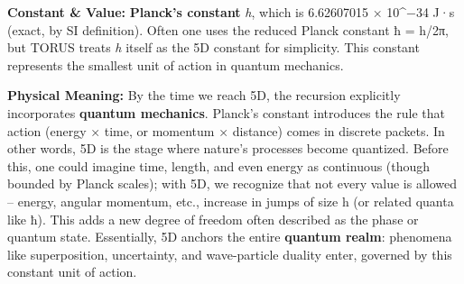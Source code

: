 \documentclass[
]{article}
\begin{document}
\textbf{Constant \& Value:} \textbf{Planck's constant} \emph{h}, which
is 6.62607015 × 10\^{}−34 J·s (exact, by SI definition)\hspace{0pt}.
Often one uses the reduced Planck constant ħ = h/2π, but TORUS treats
\emph{h} itself as the 5D constant for simplicity. This constant
represents the smallest unit of action in quantum mechanics.

\textbf{Physical Meaning:} By the time we reach 5D, the recursion
explicitly incorporates \textbf{quantum mechanics}. Planck's constant
introduces the rule that action (energy × time, or momentum × distance)
comes in discrete packets. In other words, 5D is the stage where
nature's processes become quantized\hspace{0pt}. Before this, one could
imagine time, length, and even energy as continuous (though bounded by
Planck scales); with 5D, we recognize that not every value is allowed --
energy, angular momentum, etc., increase in jumps of size h (or related
quanta like ħ). This adds a new degree of freedom often described as the
phase or quantum state. Essentially, 5D anchors the entire
\textbf{quantum realm}: phenomena like superposition, uncertainty, and
wave-particle duality enter, governed by this constant unit of action.
\end{document}
